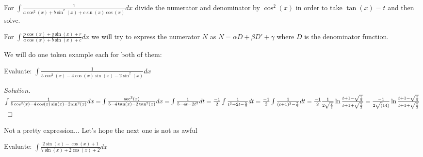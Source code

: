 \begin{theorem}
    For $\int \frac{1}{a\cos^2(x)+b\sin^2(x)+c\sin(x)\cos(x)}dx$ divide the numerator and denominator by $\cos^2(x)$ in order to take $\tan(x)=t$ and then solve.\\
\end{theorem}
\begin{theorem}
    For $\int \frac{p\cos(x)+q\sin(x)+r}{a\cos(x)+b\sin(x)+c} dx$ we will try to express the numerator $N$ as $N=\alpha D+ \beta D' + \gamma$ where $D$ is the denominator function.\\
\end{theorem}
We will do one token example each for both of them:\\
\begin{example}
    Evaluate: $\int \frac{1}{5\cos^2(x)-4\cos(x)\sin(x)-2\sin^2(x)} dx$
\end{example}
\begin{proof}
    [Solution]
    $\int \frac{1}{5\cos^2(x)-4\cos(x)\sin(x)-2\sin^2(x)} dx\\
    = \int \frac{\sec^2(x)}{5-4\tan(x)-2\tan^2(x)} dx\\
    = \int \frac{1}{5-4t-2t^2} dt\\
    = \frac{-1}{2}\int \frac{1}{t^2+2t-\frac{5}{2}} dt\\
    = \frac{-1}{2}\int \frac{1}{(t+1)^2-\frac{7}{2}} dt\\
    = \frac{-1}{2} \frac{1}{2\sqrt{\frac{7}{2}}} \ln{\frac{t+1-\sqrt{\frac{7}{2}}}{t+1+\sqrt{\frac{7}{2}}}}
    = \frac{-1}{2\sqrt(14)} \ln{\frac{t+1-\sqrt{\frac{7}{2}}}{t+1+\sqrt{\frac{7}{2}}}}
    $
\end{proof}
Not a pretty expression... Let's hope the next one is not as awful\\
\begin{example}
    Evaluate: $\int \frac{2\sin(x)-\cos(x)+1}{7\sin(x)+2\cos(x)+2}dx$
\end{example}

